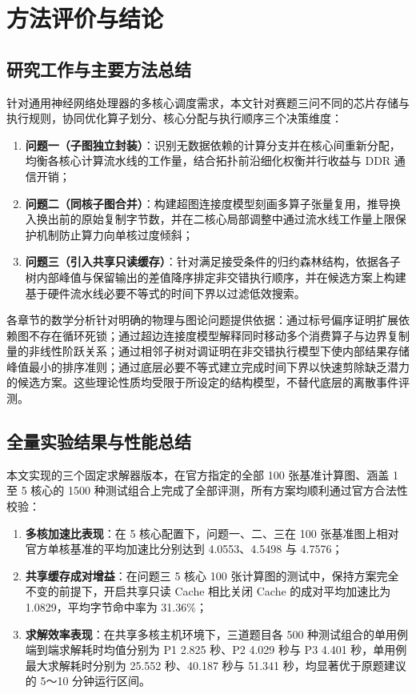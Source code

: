 \documentclass[anonymous,withtoc]{gmcm2026}
\providecommand{\tightlist}{\setlength{\itemsep}{0pt}\setlength{\parskip}{0pt}}
\begin{document}
\section{方法评价与结论}

\subsection{研究工作与主要方法总结}

针对通用神经网络处理器的多核心调度需求，本文针对赛题三问不同的芯片存储与执行规则，协同优化算子划分、核心分配与执行顺序三个决策维度：

\begin{enumerate}
\def\labelenumi{\arabic{enumi}.}
\tightlist
\item
  \textbf{问题一（子图独立封装）}：识别无数据依赖的计算分支并在核心间重新分配，均衡各核心计算流水线的工作量，结合拓扑前沿细化权衡并行收益与 DDR 通信开销；
\item
  \textbf{问题二（同核子图合并）}：构建超图连接度模型刻画多算子张量复用，推导换入换出前的原始复制字节数，并在二核心局部调整中通过流水线工作量上限保护机制防止算力向单核过度倾斜；
\item
  \textbf{问题三（引入共享只读缓存）}：针对满足接受条件的归约森林结构，依据各子树内部峰值与保留输出的差值降序排定非交错执行顺序，并在候选方案上构建基于硬件流水线必要不等式的时间下界以过滤低效搜索。
\end{enumerate}

各章节的数学分析针对明确的物理与图论问题提供依据：通过标号偏序证明扩展依赖图不存在循环死锁；通过超边连接度模型解释同时移动多个消费算子与边界复制量的非线性阶跃关系；通过相邻子树对调证明在非交错执行模型下使内部结果存储峰值最小的排序准则；通过底层必要不等式建立完成时间下界以快速剪除缺乏潜力的候选方案。这些理论性质均受限于所设定的结构模型，不替代底层的离散事件评测。

\subsection{全量实验结果与性能总结}

本文实现的三个固定求解器版本，在官方指定的全部 100 张基准计算图、涵盖 1 至 5 核心的 1500 种测试组合上完成了全部评测，所有方案均顺利通过官方合法性校验：

\begin{enumerate}
\def\labelenumi{\arabic{enumi}.}
\tightlist
\item
  \textbf{多核加速比表现}：在 5 核心配置下，问题一、二、三在 100 张基准图上相对官方单核基准的平均加速比分别达到 4.0553、4.5498 与 4.7576；
\item
  \textbf{共享缓存成对增益}：在问题三 5 核心 100 张计算图的测试中，保持方案完全不变的前提下，开启共享只读 Cache 相比关闭 Cache 的成对平均加速比为 1.0829，平均字节命中率为 31.36\%；
\item
  \textbf{求解效率表现}：在共享多核主机环境下，三道题目各 500 种测试组合的单用例端到端求解耗时均值分别为 P1 2.825 秒、P2 4.029 秒与 P3 4.401 秒，单用例最大求解耗时分别为 25.552 秒、40.187 秒与 51.341 秒，均显著优于原题建议的 5～10 分钟运行区间。
\end{enumerate}
\end{document}
